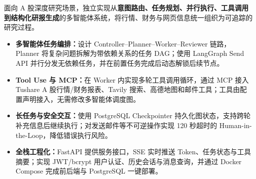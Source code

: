 \documentclass[a4paper,10pt]{article}
\newcommand{\resumeItem}[1]{\item #1}
\begin{document}
\vspace{2pt}
面向 A 股深度研究场景，独立实现从\textbf{意图路由、任务规划、并行执行、工具调用到结构化研报生成}的多智能体系统，将行情、财务与网页信息统一组织为可追踪的研究过程。

\begin{itemize}
  \resumeItem{\textbf{多智能体任务编排：}设计 Controller--Planner--Worker--Reviewer 链路，Planner 将复杂问题拆解为带依赖关系的任务 DAG；使用 LangGraph Send API 并行分发无依赖任务，并在前置任务完成后动态解锁后续节点。}
  \resumeItem{\textbf{Tool Use 与 MCP：}在 Worker 内实现多轮工具调用循环，通过 MCP 接入 Tushare A 股行情/财务报表、Tavily 搜索、高德地图和邮件工具；工具由配置声明接入，无需修改多智能体调度图。}
  \resumeItem{\textbf{长任务与安全交互：}使用 PostgreSQL Checkpointer 持久化图状态，支持跨轮补充信息后继续执行；对发送邮件等不可逆操作实现 120 秒超时的 Human-in-the-Loop，降低错误执行风险。}
  \resumeItem{\textbf{全栈工程化：}FastAPI 提供服务接口，SSE 实时推送 Token、任务状态与工具摘要；实现 JWT/bcrypt 用户认证、历史会话与消息查询，并通过 Docker Compose 完成前后端与 PostgreSQL 一键部署。}
\end{itemize}
\end{document}
